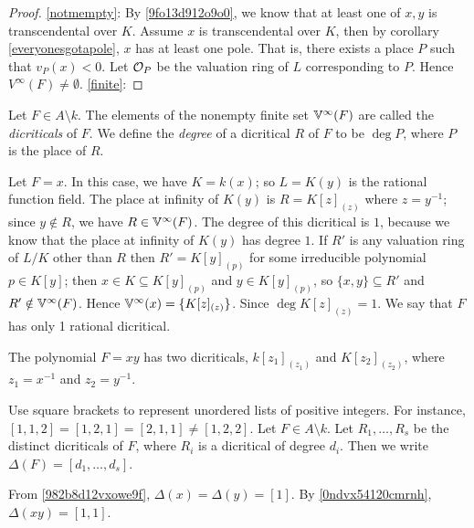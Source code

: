 \begin{proof}
\eqref{notmempty}: By \ref{9fo13d912o9o0}, 
we know that at least one of $x,y$ is transcendental 
over $K$. Assume $x$ is transcendental over $K$, then by 
corollary \ref{everyonesgotapole}, $x$ has at least one pole. 
That is, there exists 
a place $P$ such that $v_P(x)<0$. Let $\mathcal{O}_P$ be 
the valuation ring of $L$ corresponding to $P$. Hence $V^{\infty}(F) \neq \emptyset$. 
\eqref{finite}:
\end{proof}

\begin{definition}
Let $F \in A \setminus  k$.
The elements of the nonempty finite set $\mathbb{V}^\infty(F)$ are called the {\it dicriticals\/} of $F$.
We define the {\it degree\/} of a dicritical $R$ of $F$ to be $\deg P$, where
$P$ is the place of $R$.
\end{definition}

\begin{example} \label {982b8d12vxowe9f}
Let $F=x$. In this case, we have $K= k(x)$; 
so $L=K(y)$ is the rational function field.
The place at infinity of $K(y)$ is $R = K[ z ]_{(z)}$ where $z = y^{-1}$;
since $y \notin R$, we have $R \in \mathbb{V}^\infty(F)$.  
The degree of this dicritical is $1$,
because we know that the place at infinity of $K(y)$ has degree $1$.
If $R'$ is any valuation ring of $L/K$ other than $R$
then $R' = K[y]_{(p)}$ for some irreducible polynomial $p \in K[y]$;
then $x \in K \subseteq K[y]_{(p)}$ and $y \in K[y]_{(p)}$, 
so $\{x,y\} \subseteq R'$ and $R' \notin  \mathbb{V}^\infty(F)$.
Hence  $\mathbb{V}^\infty(x) = \lbrace K[z]_{(z)} \rbrace$. Since 
$\deg K[z]_{(z)} = 1$. We say that $F$ has only 1 rational 
dicritical. 
\end{example}

\begin{example} \label {0ndvx54120cmrnh}
The polynomial $F=xy$ has two dicriticals, $k[z_1]_{(z_1)}$ 
and $K[z_2]_{(z_2)}$, where $z_1=x^{-1}$ and $z_2=y^{-1}$. 
\end{example}


\begin{definition}
Use square brackets to represent unordered lists of positive integers.
For instance, $[1,1,2] = [1,2,1] = [2,1,1] \neq [1,2,2]$. Let $F \in A \setminus  k$.
Let $R_1, \dots, R_s$ be the distinct dicriticals of $F$, where $R_i$ is a dicritical of degree $d_i$.
Then we write $\Delta(F) = [ d_1, \dots, d_s ]$.
\end{definition}

\begin{examples}
From \ref{982b8d12vxowe9f}, $\Delta(x) = \Delta(y) = [1]$.
By \ref{0ndvx54120cmrnh}, $\Delta(xy)=[1,1]$.
\end{examples}
